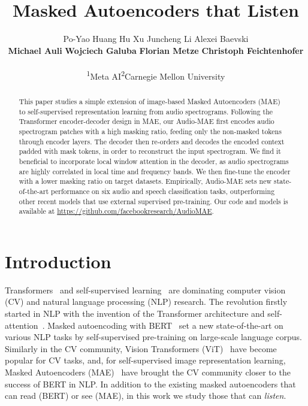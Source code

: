 \documentclass{article}
\title{Masked Autoencoders that Listen}
\author{
Po-Yao Huang\textsuperscript{} \quad Hu Xu\textsuperscript{} \quad Juncheng Li\textsuperscript{} \quad Alexei Baevski\textsuperscript{}   \\ \textbf{Michael Auli\textsuperscript{}} \quad \textbf{Wojciech Galuba\textsuperscript{}} \quad \textbf{Florian Metze\textsuperscript{}} \quad \textbf{Christoph Feichtenhofer\textsuperscript{}}
\\
\\
\textsuperscript{1}Meta AI\qquad \textsuperscript{2}Carnegie Mellon University \vspace{-1em}
}
\begin{document}
\maketitle

\begin{abstract}

\vspace{-0.8em}
This paper studies a simple extension of image-based Masked Autoencoders (MAE)~\cite{mae} to self-supervised representation learning from audio spectrograms.
Following the Transformer encoder-decoder design in MAE, our Audio-MAE first encodes audio spectrogram patches with a high masking ratio, feeding only the non-masked tokens through encoder layers.
The decoder then re-orders and decodes the encoded context padded with mask tokens, in order to reconstruct the input spectrogram.
We find it beneficial to incorporate local window attention in the decoder, as audio spectrograms are highly correlated in local time and frequency bands. 
We then fine-tune the encoder with a lower masking ratio on target datasets. Empirically, Audio-MAE sets new state-of-the-art performance on six audio and speech classification tasks, outperforming other recent models that use external supervised pre-training.
Our code and models is available at \url{https://github.com/facebookresearch/AudioMAE}.
\vspace{-0.8em}

\end{abstract}


\section{Introduction}
\vspace{-0.5em}
Transformers~\cite{Vaswani:2017:AYN:3295222.3295349} and self-supervised learning~\cite{bert,gpt,roberta,moco,mocov3,mae} are dominating computer vision (CV) and natural language processing (NLP) research. 
The revolution firstly started in NLP with the invention of the Transformer architecture and self-attention~\cite{paulus17intra}. 
Masked autoencoding with BERT~\cite{bert} set a new state-of-the-art on various NLP tasks by self-supervised pre-training on large-scale language corpus.
Similarly in the CV community, Vision Transformers (ViT)~\cite{dosovitskiy2020image} have become popular for CV tasks, and, for self-supervised image representation learning, Masked Autoencoders (MAE)~\cite{mae} have brought the CV community closer to the success of BERT in NLP.
In addition to the existing masked autoencoders that can read (BERT) or see (MAE), in this work we study those that can \textit{listen}.
\end{document}
